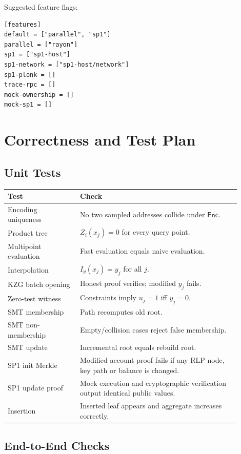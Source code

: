 \documentclass[UTF8,a4paper,11pt]{ctexart}
\newcommand{\Enc}{\mathsf{Enc}}
\begin{document}
Suggested feature flags:
\begin{lstlisting}
[features]
default = ["parallel", "sp1"]
parallel = ["rayon"]
sp1 = ["sp1-host"]
sp1-network = ["sp1-host/network"]
sp1-plonk = []
trace-rpc = []
mock-ownership = []
mock-sp1 = []
\end{lstlisting}

\section{Correctness and Test Plan}

\subsection{Unit Tests}

\begin{longtable}{p{0.28\linewidth}p{0.62\linewidth}}
\toprule
Test & Check \\
\midrule
Encoding uniqueness & No two sampled addresses collide under $\Enc$. \\
Product tree & $Z_i(x_j)=0$ for every query point. \\
Multipoint evaluation & Fast evaluation equals naive evaluation. \\
Interpolation & $I_y(x_j)=y_j$ for all $j$. \\
KZG batch opening & Honest proof verifies; modified $y_j$ fails. \\
Zero-test witness & Constraints imply $u_j=1$ iff $y_j=0$. \\
SMT membership & Path recomputes old root. \\
SMT non-membership & Empty/collision cases reject false membership. \\
SMT update & Incremental root equals rebuild root. \\
SP1 init Merkle & Modified account proof fails if any RLP node, key path or balance is changed. \\
SP1 update proof & Mock execution and cryptographic verification output identical public values. \\
Insertion & Inserted leaf appears and aggregate increases correctly. \\
\bottomrule
\end{longtable}

\subsection{End-to-End Checks}
\end{document}
